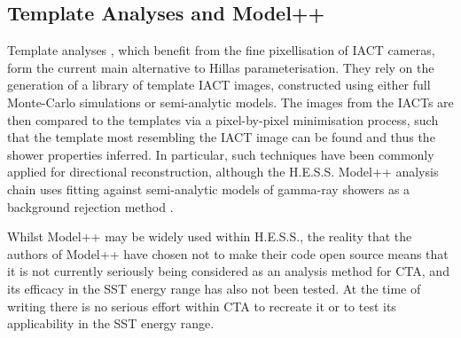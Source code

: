 \subsection{Template Analyses and Model++}
Template analyses \cite{cat}\cite{3danalysis}\cite{model++}\cite{impact}, which benefit from the fine pixellisation of IACT cameras, form the current main alternative to Hillas parameterisation. They rely on the generation of a library of template IACT images, constructed using either full Monte-Carlo simulations or semi-analytic models. The images from the IACTs are then compared to the templates via a pixel-by-pixel minimisation process, such that the template most resembling the IACT image can be found and thus the shower properties inferred. In particular, such techniques have been commonly applied for directional reconstruction, although the H.E.S.S. Model++ analysis chain uses fitting against semi-analytic models of gamma-ray showers as a background rejection method \cite{model++}.

Whilst Model++ may be widely used within H.E.S.S., the reality that the authors of Model++ have chosen not to make their code open source means that it is not currently seriously being considered as an analysis method for CTA, and its efficacy in the SST energy range has also not been tested. At the time of writing there is no serious effort within CTA to recreate it or to test its applicability in the SST energy range.

